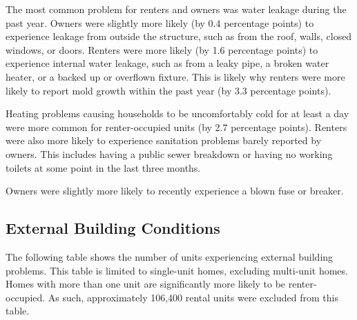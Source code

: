 \documentclass[
]{book}
\begin{document}
The most common problem for renters and owners was water leakage during the past year. Owners were slightly more likely (by 0.4 percentage points) to experience leakage from outside the structure, such as from the roof, walls, closed windows, or doors. Renters were more likely (by 1.6 percentage points) to experience internal water leakage, such as from a leaky pipe, a broken water heater, or a backed up or overflown fixture. This is likely why renters were more likely to report mold growth within the past year (by 3.3 percentage points).

Heating problems causing households to be uncomfortably cold for at least a day were more common for renter-occupied units (by 2.7 percentage points). Renters were also more likely to experience sanitation problems barely reported by owners. This includes having a public sewer breakdown or having no working toilets at some point in the last three months.

Owners were slightly more likely to recently experience a blown fuse or breaker.

\hypertarget{external-building-conditions}{%
\subsection{External Building Conditions}\label{external-building-conditions}}

The following table shows the number of units experiencing external building problems. This table is limited to single-unit homes, excluding multi-unit homes. Homes with more than one unit are significantly more likely to be renter-occupied. As such, approximately 106,400 rental units were excluded from this table.
\end{document}
